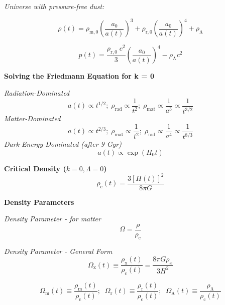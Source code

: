 \documentclass{spy}
\begin{document}
\textit {Universe with pressure-free dust:}

\begin{equation}
\rho(t) = \rho_\mathrm{m,0} \left( \frac {a_\mathrm{0}}{a(t)} \right)^3 + \rho_\mathrm{r,0} \left( \frac {a_\mathrm{0}}{a(t)} \right)^4 + \rho_\mathrm{\Lambda}
\end{equation}

\begin{equation}
p(t) = \frac {\rho_\mathrm{r,0} \; c^2}{3} \left( \frac {a_\mathrm{0}}{a(t)} \right)^4 - \rho_\mathrm{\Lambda} c^2
\end{equation}

\textbf {Solving the Friedmann Equation for k = 0}

\textit {Radiation-Dominated}
\begin{equation}
a(t) \propto t^{1/2} ; \; \rho_{\mathrm{rad}} \propto \frac {1}{t^2} ; \; \rho_{\mathrm{mat}} \propto \frac {1}{a^3} \propto \frac {1}{t^{3/2}}
\end{equation}
\textit {Matter-Dominated}
\begin{equation}
a(t) \propto t^{2/3} ; \; \rho_{\mathrm{mat}} \propto \frac {1}{t^2} ; \; \rho_{\mathrm{rad}} \propto \frac {1}{a^4} \propto \frac {1}{t^{8/3}}
\end{equation}
\textit {Dark-Energy-Dominated (after 9 Gyr)}
\begin{equation}
a(t) \propto \exp{(H_\mathrm{0}t)}
\end{equation}


\textbf {Critical Density (\( k = 0, \Lambda = 0 \))}
\begin{equation}
\rho_\mathrm{c}(t) = \frac {{3[H(t)]^2}}{8 \pi G}
\end{equation}

\textbf {Density Parameters}

\textit {Density Parameter - for matter}
\begin{equation}
\Omega = \frac {\rho}{\rho_\mathrm{c}}
\end{equation}

\textit {Density Parameter - General Form}
\begin{equation}
\Omega_\mathrm{x}(t) \equiv \frac {\rho_\mathrm{x}(t)}{\rho_\mathrm{c}(t)} = \frac {8 \pi G \rho_x}{3H^2}
\end{equation}

\begin{equation}
\Omega_\mathrm{m}(t) \equiv \frac {\rho_\mathrm{m}(t)}{\rho_\mathrm{c}(t)}; \; \; \Omega_\mathrm{r}(t) \equiv \frac {\rho_\mathrm{r}(t)}{\rho_\mathrm{c}(t)}; \; \; \Omega_\mathrm{\Lambda}(t) \equiv \frac {\rho_\mathrm{\Lambda}}{\rho_\mathrm{c}(t)}
\end{equation}
\begin{center}
\end{center}
\end{document}
